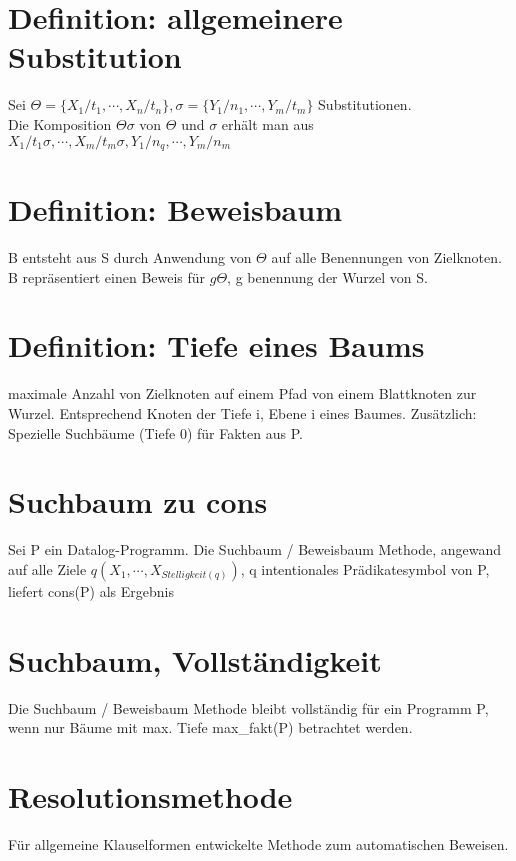 \documentclass[12pt, a4paper]{article}
\begin{document}
\section*{Definition: allgemeinere Substitution}
Sei $\Theta = \{ X_1 / t_1, \cdots, X_n / t_n \}, \sigma = \{ Y_1 / n_1, \cdots, Y_m / t_m \}$ Substitutionen. \\

Die Komposition $\Theta\sigma$ von $\Theta$ und $\sigma$ erhält man aus $X_1 / t_1\sigma, \cdots, X_m / t_m\sigma, Y_1 / n_q, \cdots, Y_m / n_m$

\section*{Definition: Beweisbaum}
B entsteht aus S durch Anwendung von $\Theta$ auf alle Benennungen von Zielknoten. B repräsentiert einen Beweis für $g\Theta$, g benennung der Wurzel von S.

\section*{Definition: Tiefe eines Baums}
maximale Anzahl von Zielknoten auf einem Pfad von einem Blattknoten zur Wurzel. Entsprechend Knoten der Tiefe i, Ebene i eines Baumes. Zusätzlich: Spezielle Suchbäume (Tiefe 0) für Fakten aus P.

\section*{Suchbaum zu cons}
Sei P ein Datalog-Programm. Die Suchbaum  / Beweisbaum Methode, angewand auf alle Ziele $q(X_1, \cdots, X_{Stelligkeit(q)})$, q intentionales Prädikatesymbol von P, liefert cons(P) als Ergebnis

\section*{Suchbaum, Vollständigkeit}
Die Suchbaum / Beweisbaum Methode bleibt vollständig für ein Programm P, wenn nur Bäume mit max. Tiefe max\_fakt(P) betrachtet werden.

\section*{Resolutionsmethode}
Für allgemeine Klauselformen entwickelte Methode zum automatischen Beweisen.
\end{document}
